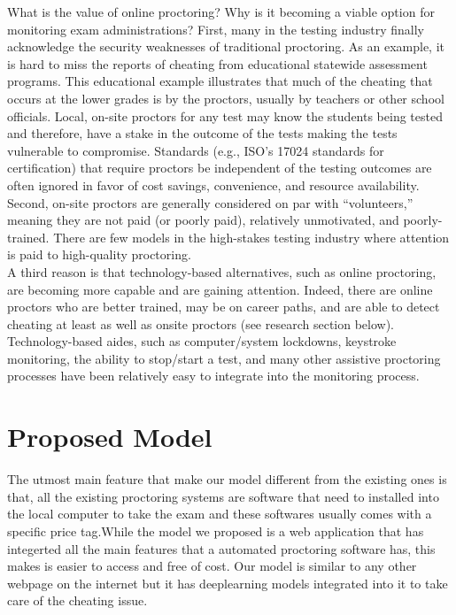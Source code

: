 \documentclass[12pt]{report}
\begin{document}
What is the value of online proctoring? Why is it becoming a viable option for monitoring exam administrations?
First, many in the testing industry finally acknowledge the security weaknesses of traditional proctoring. As an example,
it is hard to miss the reports of cheating from educational statewide assessment programs. This educational example
illustrates that much of the cheating that occurs at the lower grades is by the proctors, usually by teachers or other
school officials. Local, on-site proctors for any test may know the students being tested and therefore, have a stake in
the outcome of the tests making the tests vulnerable to compromise. Standards (e.g., ISO’s 17024 standards for
certification) that require proctors be independent of the testing outcomes are often ignored in favor of cost savings,
convenience, and resource availability.\\

Second, on-site proctors are generally considered on par with “volunteers,” meaning they are not paid (or poorly paid),
relatively unmotivated, and poorly-trained. There are few models in the high-stakes testing industry where attention is
paid to high-quality proctoring.\\

A third reason is that technology-based alternatives, such as online proctoring, are becoming more capable and are
gaining attention. Indeed, there are online proctors who are better trained, may be on career paths, and are able to
detect cheating at least as well as onsite proctors (see research section below). Technology-based aides, such as
computer/system lockdowns, keystroke monitoring, the ability to stop/start a test, and many other assistive proctoring
processes have been relatively easy to integrate into the monitoring process.
\section{ Proposed Model}
The utmost main feature that make our model different from the existing ones is that, all the existing proctoring systems are software that need to installed into the local computer to take the exam and these softwares usually comes with a specific price tag.While the model we proposed is a web application that has integerted all the main features that a automated proctoring software has, this makes is easier to access and free of cost. Our model is similar to any other webpage on the internet but it has deeplearning models integrated into it to take care of the cheating issue.\\
\end{document}
